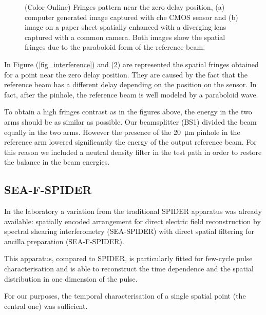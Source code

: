 \documentclass[12pt,a4paper,twoside]{article}
\begin{document}
\begin{figure}
\begin{subfigure}[b]{0.45\textwidth}
        \caption{}
        \label{photo_interference}
    \end{subfigure}
    \caption{(Color Online) Fringes pattern near the zero delay position, (a) computer generated image captured with che CMOS sensor and (b) image on a paper sheet spatially enhanced with a diverging lens captured with a common camera. Both images show the spatial fringes due to the paraboloid form of the reference beam.}
\end{figure}

In Figure (\ref{fig_interference}) and (\ref{photo_interference}) are represented the spatial fringes obtained for a point near the zero delay position.
They are caused by the fact that the reference beam has a different delay depending on the position on the sensor.
In fact, after the pinhole, the reference beam is well modeled by a paraboloid wave.

To obtain a high fringes contrast as in the figures above, the energy in the two arms should be as similar as possible.
Our beamsplitter (BS1) divided the beam equally in the two arms.
However the presence of the \SI{20}{\um} pinhole in the reference arm lowered significantly the energy of the output reference beam.
For this reason we included a neutral density filter in the test path in order to restore the balance in the beam energies.

\subsection{SEA-F-SPIDER}
In the laboratory a variation from the traditional SPIDER apparatus was already available: spatially encoded arrangement for direct electric field reconstruction by spectral shearing interferometry (SEA-SPIDER) with direct spatial filtering for ancilla preparation (SEA-F-SPIDER).

This apparatus, compared to SPIDER, is particularly fitted for few-cycle pulse characterisation and is able to reconstruct the time dependence and the spatial distribution in one dimension of the pulse.

For our purposes, the temporal characterisation of a single spatial point (the central one) was sufficient.

\clearpage
\end{document}
